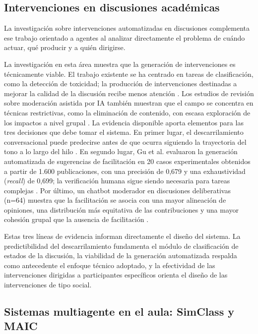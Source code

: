 \subsection{Intervenciones en discusiones académicas}

La investigación sobre intervenciones automatizadas en discusiones complementa ese trabajo orientado a agentes al analizar directamente el problema de cuándo actuar, qué producir y a quién dirigirse.

La investigación en esta área muestra que la generación de intervenciones es técnicamente viable. El trabajo existente se ha centrado en tareas de clasificación, como la detección de toxicidad; la producción de intervenciones destinadas a mejorar la calidad de la discusión recibe menos atención \parencite{KorreEtAl2025}. Los estudios de revisión sobre moderación asistida por IA también muestran que el campo se concentra en técnicas restrictivas, como la eliminación de contenido, con escasa exploración de los impactos a nivel grupal \parencite{YuEtAl2024review}. La evidencia disponible aporta elementos para las tres decisiones que debe tomar el sistema. En primer lugar, el descarrilamiento conversacional puede predecirse antes de que ocurra siguiendo la trayectoria del tono a lo largo del hilo \parencite{ChangDanescu2019}. En segundo lugar, Gu et al. evaluaron la generación automatizada de sugerencias de facilitación en 20 casos experimentales obtenidos a partir de 1.600 publicaciones, con una precisión de 0,679 y una exhaustividad (\textit{recall}) de 0,699; la verificación humana sigue siendo necesaria para tareas complejas \parencite{GuEtAl2021}. Por último, un chatbot moderador en discusiones deliberativas (n=64) muestra que la facilitación se asocia con una mayor alineación de opiniones, una distribución más equitativa de las contribuciones y una mayor cohesión grupal que la ausencia de facilitación \parencite{KimEtAl2021}.

Estas tres líneas de evidencia informan directamente el diseño del sistema. La predictibilidad del descarrilamiento \parencite{ChangDanescu2019} fundamenta el módulo de clasificación de estados de la discusión, la viabilidad de la generación automatizada \parencite{GuEtAl2021} respalda como antecedente el enfoque técnico adoptado, y la efectividad de las intervenciones dirigidas a participantes específicos \parencite{KimEtAl2021} orienta el diseño de las intervenciones de tipo social.

\subsection{Sistemas multiagente en el aula: SimClass y MAIC}

